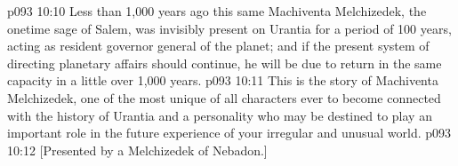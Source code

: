 \vs p093 10:10 Less than 1,000 years ago this same Machiventa Melchizedek, the onetime sage of Salem, was invisibly present on Urantia for a period of 100 years, acting as resident governor general of the planet; and if the present system of directing planetary affairs should continue, he will be due to return in the same capacity in a little over 1,000 years.
\vs p093 10:11 \pc This is the story of Machiventa Melchizedek, one of the most unique of all characters ever to become connected with the history of Urantia and a personality who may be destined to play an important role in the future experience of your irregular and unusual world.
\vsetoff
\vs p093 10:12 [Presented by a Melchizedek of Nebadon.]
